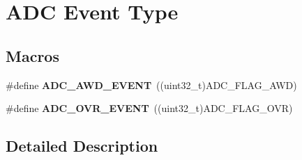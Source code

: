 \hypertarget{group___a_d_c___event__type}{}\section{A\+DC Event Type}
\label{group___a_d_c___event__type}
\subsection*{Macros}
\begin{DoxyCompactItemize}
\item 
\#define {\bfseries A\+D\+C\+\_\+\+A\+W\+D\+\_\+\+E\+V\+E\+NT}~((uint32\+\_\+t)A\+D\+C\+\_\+\+F\+L\+A\+G\+\_\+\+A\+WD)\hypertarget{group___a_d_c___event__type_ga2d1d545ea1bfecba7a7081be6ef2cb93}{}\label{group___a_d_c___event__type_ga2d1d545ea1bfecba7a7081be6ef2cb93}

\item 
\#define {\bfseries A\+D\+C\+\_\+\+O\+V\+R\+\_\+\+E\+V\+E\+NT}~((uint32\+\_\+t)A\+D\+C\+\_\+\+F\+L\+A\+G\+\_\+\+O\+VR)\hypertarget{group___a_d_c___event__type_gae1ef5aaecb2d24cac50a59f1bc311221}{}\label{group___a_d_c___event__type_gae1ef5aaecb2d24cac50a59f1bc311221}

\end{DoxyCompactItemize}


\subsection{Detailed Description}
